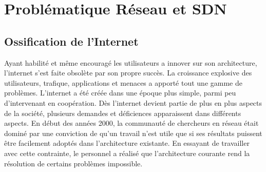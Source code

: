 \chapter{Problématique Réseau et SDN}
\label{chap-1}



\section{Ossification de l'Internet}


Ayant habilité et même encouragé les utilisateurs a innover sur son architecture, l'internet s'est faite obsolète par son propre succès. La croissance explosive des utilisateurs, trafique, applications et menaces a apporté tout une gamme de problèmes. L'internet a été créée dans une époque plus simple, parmi peu d'intervenant en coopération. Dès l'internet devient partie de plus en plus aspects de la société, plusieurs demandes et déficiences apparaissent dans différents aspects. En début des années 2000, la communauté de chercheurs en réseau était dominé par une conviction de qu'un travail n'est utile que si ses résultats puissent être facilement adoptés dans l'architecture existante. En essayant de travailler avec cette contrainte, le personnel a réalisé que l'architecture courante rend la résolution de certains problèmes impossible. \cite{InternetEvolutionRoleSoftwareEngineering}






